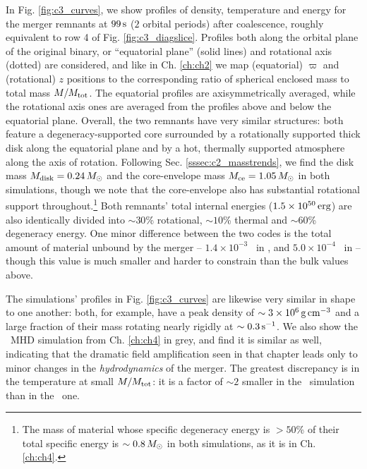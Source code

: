 In Fig. \ref{fig:c3_curves}, we show profiles of density, temperature and energy for the merger remnants at $99\,\mathrm{s}$ ($2$ orbital periods) after coalescence, roughly equivalent to row 4 of Fig. \ref{fig:c3_diagslice}.  Profiles both along the orbital plane of the original binary, or ``equatorial plane'' (solid lines) and rotational axis (dotted) are considered, and like in Ch. \ref{ch:ch2} we map (equatorial) $\varpi$ and (rotational) $z$ positions to the corresponding ratio of spherical enclosed mass to total mass $M/M_{\rm tot}$.  The equatorial profiles are axisymmetrically averaged, while the rotational axis ones are averaged from the profiles above and below the equatorial plane.  Overall, the two remnants have very similar structures: both feature a degeneracy-supported core surrounded by a rotationally supported thick disk along the equatorial plane and by a hot, thermally supported atmosphere along the axis of rotation.  Following Sec. \ref{sssec:c2_masstrends}, we find the disk mass $\Mdisk = 0.24\,\Msun$ and the core-envelope mass $\Mrem = 1.05\,\Msun$ in both simulations, though we note that the core-envelope also has substantial rotational support throughout.\footnote{The mass of material whose specific degeneracy energy is $>50$\% of their total specific energy is $\sim0.8\,\Msun$ in both simulations, as it is in Ch. \ref{ch:ch4}.}  Both remnants' total internal energies ($1.5\times10^{50}\,\mathrm{erg}$) are also identically divided into $\sim30$\% rotational, $\sim10$\% thermal and $\sim60$\% degeneracy energy.  One minor difference between the two codes is the total amount of material unbound by the merger -- $1.4\times10^{-3}$ \Msun\ in \gasoline, and $5.0\times10^{-4}$ \Msun\ in \arepo -- though this value is much smaller and harder to constrain than the bulk values above.



The simulations' profiles in Fig. \ref{fig:c3_curves} are likewise very similar in shape to one another: both, for example, have a peak density of $\sim3\times10^6\,\gcc$ and a large fraction of their mass rotating nearly rigidly at $\sim0.3\,\psec$.  We also show the \arepo\ MHD simulation from Ch. \ref{ch:ch4} in grey, and find it is similar as well, indicating that the dramatic field amplification seen in that chapter leads only to minor changes in the \textit{hydrodynamics} of the merger.  The greatest discrepancy is in the temperature at small $M/M_{\rm tot}$: it is a factor of $\sim2$ smaller in the \arepo\ simulation than in the \gasoline\ one.

